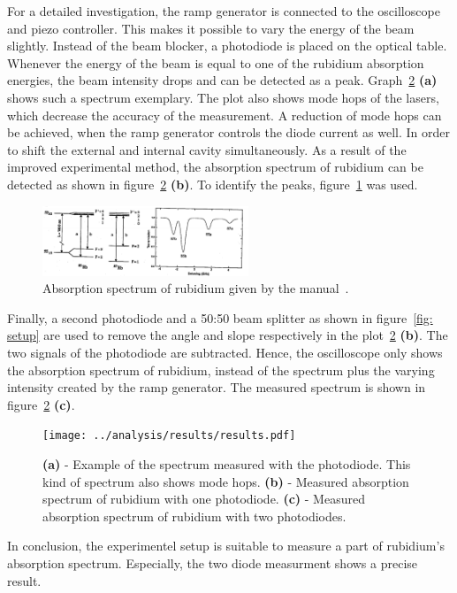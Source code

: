 For a detailed investigation, the ramp generator is connected to the oscilloscope
and piezo controller. This makes it possible to vary the energy of the beam slightly.
Instead of the beam blocker, a photodiode is placed on the
optical table. Whenever the energy of the beam is equal to one of the rubidium
absorption energies, the beam intensity drops and can be detected as a peak.
Graph~\ref{fig: spectrum_measured} \textbf{(a)} shows such a spectrum exemplary.
The plot also shows mode hops of the lasers, which decrease the accuracy of the
measurement. A reduction of mode hops can be achieved, when the ramp generator
controls the diode current as well. In order to shift the external and internal cavity
simultaneously. As a result of the improved experimental method, the absorption
spectrum of rubidium can be detected as shown in figure~\ref{fig: spectrum_measured} \textbf{(b)}.
To identify the peaks, figure~\ref{fig: spectrum_manual} was used.
\begin{figure}
  \centering
  \includegraphics[width = 0.55\textwidth]{./content/images/absorption_spectrum_rubidium.png}
  \caption{Absorption spectrum of rubidium given by the manual~\cite{anleitung60}.}
  \label{fig: spectrum_manual}
\end{figure}
Finally, a second photodiode and a 50:50 beam splitter as shown in figure~\ref{fig: setup}
are used to remove the angle and slope respectively in the plot~\ref{fig: spectrum_measured} \textbf{(b)}. The two signals of
the photodiode are subtracted. Hence, the oscilloscope only shows the
absorption spectrum of rubidium, instead of the spectrum plus the varying intensity created by the
ramp generator. The measured spectrum is shown in figure~\ref{fig: spectrum_measured} \textbf{(c)}.
\begin{figure}
  \centering
  \texttt{[image: ../analysis/results/results.pdf]}
  \caption{\textbf{(a)} - Example of the spectrum measured with the photodiode. This kind of spectrum also
          shows mode hops. \textbf{(b)} - Measured absorption spectrum of rubidium with one photodiode. \textbf{(c)} - Measured absorption spectrum of rubidium with two photodiodes.}
  \label{fig: spectrum_measured}
\end{figure}
In conclusion, the experimentel setup is suitable to measure a part of
rubidium's absorption spectrum. Especially, the two diode measurment shows
a precise result.
